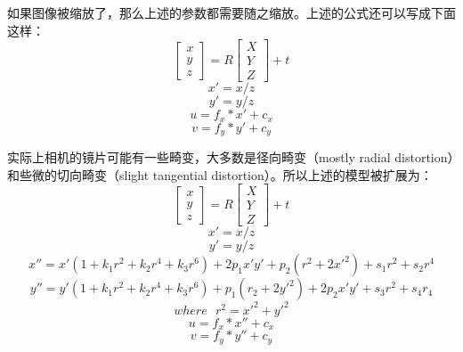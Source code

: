 如果图像被缩放了，那么上述的参数都需要随之缩放。上述的公式还可以写成下面这样：
\begin{equation*}
	\left[\begin{array}{c}
		x \\
		y \\
		z
	\end{array}
	\right]
	=
	R 
	\left[\begin{array}{c}
		X \\
		Y \\
		Z
	\end{array}
	\right]
	+ t
\end{equation*}
\begin{equation*}
	x' = x / z
\end{equation*}
\begin{equation*}
	y' = y / z
\end{equation*}
\begin{equation*}
	u = f_x * x' + c_x
\end{equation*}
\begin{equation*}
	v = f_y * y' + c_y
\end{equation*}



实际上相机的镜片可能有一些畸变，大多数是径向畸变（mostly radial distortion）和些微的切向畸变（slight tangential distortion）。所以上述的模型被扩展为：
\begin{equation*}
\left[\begin{array}{c}
x \\
y \\
z
\end{array}
\right]
=
R 
\left[\begin{array}{c}
X \\
Y \\
Z
\end{array}
\right]
+ t
\end{equation*}
\begin{equation*}
x' = x / z
\end{equation*}
\begin{equation*}
y' = y / z
\end{equation*}
\begin{equation*}
x'' = x'(1 + k_1 r^2 + k_2 r^4 + k_3 r^6) + 2p_1 x' y'+p_2(r^2+2x'^2)+s_1 r^2 + s_2 r^4
\end{equation*}
\begin{equation*}
y'' = y'(1 + k_1 r^2 + k_2 r^4 + k_3 r^6)  + p_1(r_2 + 2y'^2) + 2p_2 x' y' + s_3 r^2 + s_4 r_4
\end{equation*}
\begin{equation*}
where \ \ \ r^2 = x'^2 + y'^2
\end{equation*}
\begin{equation*}
u = f_x * x'' + c_x
\end{equation*}
\begin{equation*}
v = f_y * y'' + c_y
\end{equation*}


